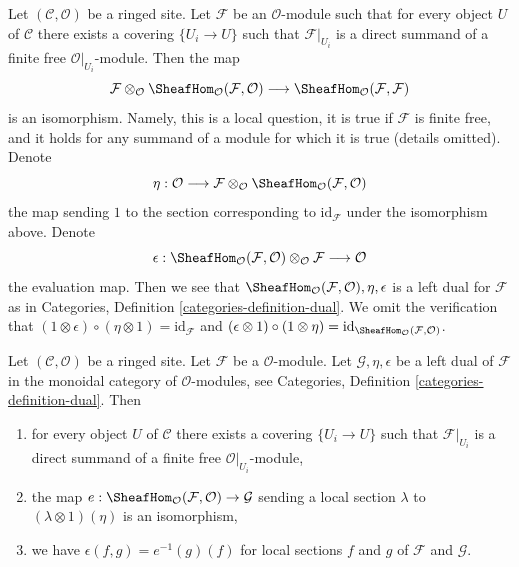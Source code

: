 \begin{example}
\label{example-dual}
Let $(\mathcal{C}, \mathcal{O})$ be a ringed site. Let $\mathcal{F}$
be an $\mathcal{O}$-module such that for every object $U$ of $\mathcal{C}$
there exists a covering $\{U_i \to U\}$ such that $\mathcal{F}|_{U_i}$
is a direct summand of a finite free $\mathcal{O}|_{U_i}$-module.
Then the map
$$
\mathcal{F} \otimes_\mathcal{O}
\SheafHom_\mathcal{O}(\mathcal{F}, \mathcal{O})
\longrightarrow
\SheafHom_\mathcal{O}(\mathcal{F}, \mathcal{F})
$$
is an isomorphism. Namely, this is a local question, it is true
if $\mathcal{F}$ is finite free, and it holds for any summand
of a module for which it is true (details omitted). Denote
$$
\eta :
\mathcal{O}
\longrightarrow
\mathcal{F} \otimes_\mathcal{O}
\SheafHom_\mathcal{O}(\mathcal{F}, \mathcal{O})
$$
the map sending $1$ to the section corresponding to
$\text{id}_\mathcal{F}$ under the isomorphism above.
Denote
$$
\epsilon : 
\SheafHom_\mathcal{O}(\mathcal{F}, \mathcal{O})
\otimes_\mathcal{O} \mathcal{F}
\longrightarrow
\mathcal{O}
$$
the evaluation map. Then we see that
$\SheafHom_\mathcal{O}(\mathcal{F}, \mathcal{O}), \eta, \epsilon$
is a left dual for $\mathcal{F}$ as in
Categories, Definition \ref{categories-definition-dual}.
We omit the verification that
$(1 \otimes \epsilon) \circ (\eta \otimes 1) = \text{id}_\mathcal{F}$
and
$(\epsilon \otimes 1) \circ (1 \otimes \eta) =
\text{id}_{\SheafHom_\mathcal{O}(\mathcal{F}, \mathcal{O})}$.
\end{example}

\begin{lemma}
\label{lemma-left-dual-module}
Let $(\mathcal{C}, \mathcal{O})$ be a ringed site. Let $\mathcal{F}$ be a
$\mathcal{O}$-module. Let $\mathcal{G}, \eta, \epsilon$
be a left dual of $\mathcal{F}$ in the monoidal category of
$\mathcal{O}$-modules, see
Categories, Definition \ref{categories-definition-dual}. Then
\begin{enumerate}
\item for every object $U$ of $\mathcal{C}$
there exists a covering $\{U_i \to U\}$ such that $\mathcal{F}|_{U_i}$
is a direct summand of a finite free $\mathcal{O}|_{U_i}$-module,
\item the map
$e : \SheafHom_\mathcal{O}(\mathcal{F}, \mathcal{O}) \to \mathcal{G}$
sending a local section $\lambda$ to $(\lambda \otimes 1)(\eta)$
is an isomorphism,
\item we have $\epsilon(f, g) = e^{-1}(g)(f)$ for local sections
$f$ and $g$ of $\mathcal{F}$ and $\mathcal{G}$.
\end{enumerate}
\end{lemma}

